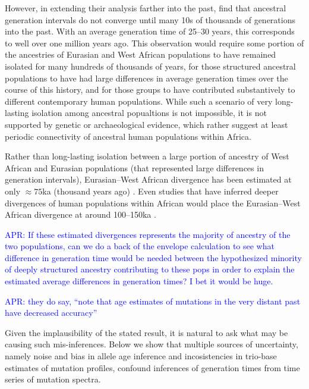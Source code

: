 \documentclass[]{article}
\newcommand{\aprcomment}[1]{{\textcolor{blue}{APR: #1}}}
\begin{document}
However, in extending their analysis farther into the past,
\citeauthor{wang2023human} find that ancestral generation intervals do not
converge until many 10s of thousands of generations into the past. With an
average generation time of 25--30 years, this corresponds to well over one
million years ago. This observation would require some portion of the
ancestries of Eurasian and West African populations to have remained isolated
for many hundreds of thousands of years, for those structured ancestral
populations to have had large differences in average generation times over the
course of this history, and for those groups to have contributed substantively
to different contemporary human populations. While such a scenario of very
long-lasting isolation among ancestral popualtions is not impossible, it is not
supported by genetic \citep{ragsdale2022weakly,others} or archaeological
\citep{scerri2018did,others} evidence, which rather suggest at least periodic
connectivity of ancestral human populations within Africa.

Rather than long-lasting isolation between a large portion of ancestry of West
African and Eurasian populations (that represented large differences in
generation intervals), Eurasian--West African divergence has been estimated at
only $\approx 75$ka (thousand years ago)
\citep[e.g.,][]{pagani2015tracing,other}. Even studies that have inferred
deeper divergences of human populations within African would place the
Eurasian--West African divergence at around 100--150ka
\citep{schlebusch2017southern}. 

\aprcomment{
    If these estimated divergences represents the majority of ancestry of the
    two populations, can we do a back of the envelope calculation to see what
    difference in generation time would be needed between the hypothesized
    minority of deeply structured ancestry contributing to these pops in order
    to explain the estimated average differences in generation times? I bet it
    would be huge.
}

\aprcomment{they do say, ``note that age estimates of mutations in the very
distant past have decreased accuracy''}

Given the implausibility of the stated result, it is natural to ask what may be
causing such mis-inferences. Below we show that multiple sources of uncertainty,
namely noise and bias in allele age inference and incosistencies in trio-base
estimates of mutation profiles, confound inferences of generation times from
time series of mutation spectra.
\end{document}

